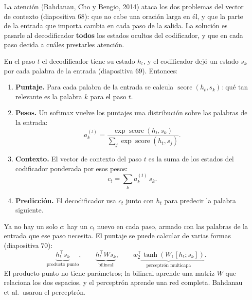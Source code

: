 \documentclass[11pt,letterpaper]{article}
\begin{document}
La atención (Bahdanau, Cho y Bengio, 2014) ataca los dos problemas del
vector de contexto (diapositiva $68$): que no cabe una oración larga en
él, y que la parte de la entrada que importa cambia en cada paso de la
salida. La solución es pasarle al decodificador \textbf{todos} los
estados ocultos del codificador, y que en cada paso decida a cuáles
prestarles atención.

En el paso $t$ el decodificador tiene su estado $h_t$, y el
codificador dejó un estado $s_k$ por cada palabra de la entrada
(diapositiva $69$). Entonces:

\begin{enumerate}[itemsep=0.3em]
    \item \textbf{Puntaje.} Para cada palabra de la entrada se calcula
          $\operatorname{score}(h_t, s_k)$: qué tan relevante es la
          palabra $k$ para el paso $t$.
    \item \textbf{Pesos.} Un softmax vuelve los puntajes una
          distribución sobre las palabras de la entrada:
          \[
              a_k^{(t)} = \frac{\exp \operatorname{score}(h_t, s_k)}
                               {\sum_{j} \exp \operatorname{score}(h_t,
                                s_j)} .
          \]
    \item \textbf{Contexto.} El vector de contexto del paso $t$ es la
          suma de los estados del codificador ponderada por esos pesos:
          \[
              c_t = \sum_{k} a_k^{(t)}\, s_k .
          \]
    \item \textbf{Predicción.} El decodificador usa $c_t$ junto con
          $h_t$ para predecir la palabra siguiente.
\end{enumerate}

Ya no hay un solo $c$: hay un $c_t$ nuevo en cada paso, armado con las
palabras de la entrada que ese paso necesita. El puntaje se puede
calcular de varias formas (diapositiva $70$):
\[
    \underbrace{h_t^{\top} s_k}_{\text{producto punto}} ,
    \qquad
    \underbrace{h_t^{\top} W s_k}_{\text{bilineal}} ,
    \qquad
    \underbrace{w_2^{\top} \tanh\!\left(W_1 [h_t; s_k]\right)}
               _{\text{perceptrón multicapa}} .
\]
El producto punto no tiene parámetros; la bilineal aprende una matriz
$W$ que relaciona los dos espacios, y el perceptrón aprende una red
completa. Bahdanau et al.\ usaron el perceptrón.
\end{document}

